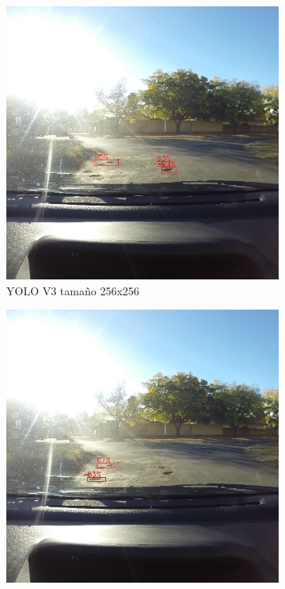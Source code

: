 \begin{figure}[H]
\begin{subfigure}[h]{0.45\linewidth}
		\includegraphics[width=\linewidth]{images/results_b_yolo_v3_256.jpg}
		\caption{YOLO V3 tamaño 256x256}
	\end{subfigure}
	\begin{subfigure}[h]{0.45\linewidth}
		\includegraphics[width=\linewidth]{images/results_b_yolo_v3_416.jpg}

\end{subfigure}
\end{figure}
